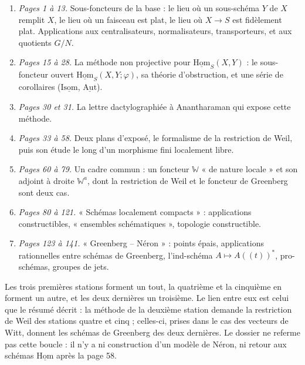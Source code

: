 \documentclass[11pt,a4paper]{article}
\begin{document}
\begin{enumerate}
  \item \emph{Pages 1 à 13.} Sous-foncteurs de la base : le lieu où un
  sous-schéma $Y$ de $X$ remplit $X$, le lieu où un faisceau est plat, le lieu
  où $X \to S$ est fidèlement plat. Applications aux centralisateurs,
  normalisateurs, transporteurs, et aux quotients $G/N$.
  \item \emph{Pages 15 à 28.} La méthode non projective pour
  $\underline{\mathrm{Hom}}_S(X,Y)$ : le sous-foncteur ouvert
  $\underline{\mathrm{Hom}}_S(X,Y;\varphi)$, sa théorie d'obstruction, et une
  série de corollaires ($\underline{\mathrm{Isom}}$, $\underline{\mathrm{Aut}}$).
  \item \emph{Pages 30 et 31.} La lettre dactylographiée à Anantharaman qui
  expose cette méthode.
  \item \emph{Pages 33 à 58.} Deux plans d'exposé, le formalisme de la
  restriction de Weil, puis son étude le long d'un morphisme fini localement
  libre.
  \item \emph{Pages 60 à 79.} Un cadre commun : un foncteur $\mathbb{W}$ « de
  nature locale » et son adjoint à droite $\mathbb{W}^{a}$, dont la
  restriction de Weil et le foncteur de Greenberg sont deux cas.
  \item \emph{Pages 80 à 121.} « Schémas localement compacts » : applications
  constructibles, « ensembles schématiques », topologie constructible.
  \item \emph{Pages 123 à 141.} « Greenberg -- Néron » : points épais,
  applications rationnelles entre schémas de Greenberg, l'ind-schéma
  $A \mapsto A((t))^{*}$, pro-schémas, groupes de jets.
\end{enumerate}

Les trois premières stations forment un tout, la quatrième et la cinquième en
forment un autre, et les deux dernières un troisième. Le lien entre eux est
celui que le résumé décrit : la méthode de la deuxième station demande la
restriction de Weil des stations quatre et cinq ; celles-ci, prises dans le
cas des vecteurs de Witt, donnent les schémas de Greenberg des deux
dernières. Le dossier ne referme pas cette boucle : il n'y a ni construction
d'un modèle de Néron, ni retour aux schémas $\underline{\mathrm{Hom}}$ après la
page 58.
\end{document}
